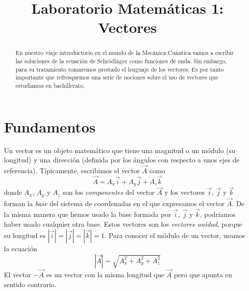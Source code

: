 \documentclass{tufte-handout}
\title[Química Física II: M1 Vectores]{
Laboratorio Matemáticas 1: Vectores}
\date{}  %
\begin{document}
\maketitle%

\begin{abstract}
\noindent En nuestro viaje introductorio
en el mundo de la Mecánica Cuántica vamos a escribir las soluciones
de la ecuación de Schr\=odinger como funciones de onda. Sin
embargo, para su tratamiento tomaremos prestado el lenguaje de los vectores. 
Es por tanto importante que refresquemos una serie de nociones sobre el uso de vectores 
que estudiamos en bachillerato.
\end{abstract}


\section{Fundamentos}
Un vector es un objeto matemático que tiene una magnitud 
o un módulo (su longitud) y una dirección (definida por 
los ángulos con respecto a unos ejes de referencia).
Típicamente, escribimos el vector $\vec{A}$ como
\begin{equation}
    \vec{A}=A_x\vec{i} + A_y\vec{j} + A_z\vec{k}
\end{equation}
donde $A_x$, $A_y$ y $A_z$ son los \textit{componentes} del 
vector $\vec{A}$ y los vectores $\vec{i}$, $\vec{j}$
y $\vec{k}$ forman la \textit{base} del sistema
de coordenadas en el que expresamos el vector $\vec{A}$.
De la misma manera que hemos usado la base formada por 
$\vec{i}$, $\vec{j}$ y $\vec{k}$, podríamos haber usado
cualquier otra base. Estos vectores son los \textit{vectores
unidad}, porque su longitud es $|\vec{i}|=|\vec{j}|=|\vec{k}|=1$.
Para conocer el módulo de un vector, usamos la ecuación
\begin{equation}
    |\vec{A}|=\sqrt{A_x^2+A_y^2+A_z^2}
\end{equation}
El vector $-\vec{A}$ es un vector con la misma longitud que
$\vec{A}$ pero que apunta en sentido contrario.
\end{document}
